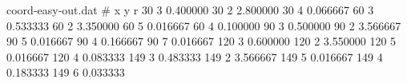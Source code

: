 
        \begin{filecontents}{coord-easy-out.dat}
            # x  y  r 
	 30 3 0.400000 
	 30 2 2.800000 
	 30 4 0.066667 
	 60 3 0.533333 
	 60 2 3.350000 
	 60 5 0.016667 
	 60 4 0.100000 
	 90 3 0.500000 
	 90 2 3.566667 
	 90 5 0.016667 
	 90 4 0.166667 
	 90 7 0.016667 
	 120 3 0.600000 
	 120 2 3.550000 
	 120 5 0.016667 
	 120 4 0.083333 
	 149 3 0.483333 
	 149 2 3.566667 
	 149 5 0.016667 
	 149 4 0.183333 
	 149 6 0.033333 

        \end{filecontents}
        
